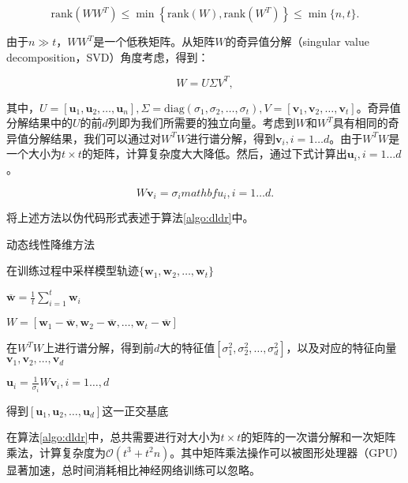 \begin{equation}
    \text{rank}(WW^T) \le \min \left\{\text{rank}(W), \text{rank}(W^T)\right\}\le \min\{n, t\}.
\end{equation}

由于$n\gg t$，$WW^T$是一个低秩矩阵。从矩阵$W$的奇异值分解（singular value decomposition，SVD）角度考虑，得到：

\begin{equation}
    W = U\Sigma V^T,
\end{equation}

其中，$U = [\mathbf{u}_1, \mathbf{u}_2, \dots, \mathbf{u}_n], \Sigma = \text{diag}(\sigma_1, \sigma_2, \dots, \sigma_{t}), V = [\mathbf{v}_1, \mathbf{v}_2, \dots, \mathbf{v}_t]$。奇异值分解结果中的$U$的前$d$列即为我们所需要的独立向量。考虑到$W$和$W^T$具有相同的奇异值分解结果，我们可以通过对$W^TW$进行谱分解，得到$\mathbf{v}_i, i = 1\dots d$。由于$W^TW$是一个大小为$t\times t$的矩阵，计算复杂度大大降低。然后，通过下式计算出$\mathbf{u}_i, i = 1\dots d$。


\begin{equation}
    W\mathbf{v}_i = \sigma_i mathbf{u}_i, i= 1\dots d.
\end{equation}

将上述方法以伪代码形式表述于算法\ref{algo:dldr}中。

\begin{algorithm}[htb]
    \caption{动态线性降维方法}
    \label{algo:dldr}
    \small
    \SetAlgoLined
    在训练过程中采样模型轨迹$\{\mathbf{w}_1, \mathbf{w}_2, \dots, \mathbf{w}_t\}$\;

    $\overline{\mathbf{w}} = \frac{1}{t}\sum_{i = 1}^t{\mathbf{w}_i}$\;

    $ W = [\mathbf{w}_1 - \overline{\mathbf{w}}, \mathbf{w}_2 - \overline{\mathbf{w}}, \dots, \mathbf{w}_t - \overline{\mathbf{w}}]$\;

    在$W^TW$上进行谱分解，得到前$d$大的特征值$[\sigma_1^2, \sigma_2^2, \dots, \sigma_d^2]$，以及对应的特征向量$\mathbf{v}_1, \mathbf{v}_2, \dots, \mathbf{v}_d$\;

    $\mathbf{u}_i = \frac{1}{\sigma_i}W\mathbf{v}_i, i = 1 \dots, d$\;
    
    得到$[\mathbf{u}_1, \mathbf{u}_2, \dots, \mathbf{u}_d]$这一正交基底\;

  \end{algorithm}

在算法\ref{algo:dldr}中，总共需要进行对大小为$t\times t$的矩阵的一次谱分解和一次矩阵乘法，计算复杂度为$\mathcal{O}\left(t^3 + t^2n\right)$。其中矩阵乘法操作可以被图形处理器（GPU）显著加速，总时间消耗相比神经网络训练可以忽略。

